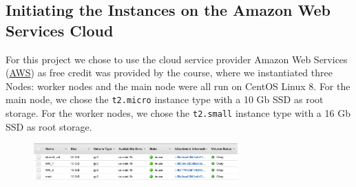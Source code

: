 \documentclass{article}
\begin{document}
\subsection{Initiating the Instances on the Amazon Web Services Cloud}
For this project we chose to use the cloud service provider Amazon Web Services (\href{https://aws.amazon.com/}{AWS}) as free credit was provided by the course, where we instantiated three Nodes: worker nodes and the main node were all run on CentOS Linux 8.
For the main node, we chose the \texttt{t2.micro} instance type with a 10 Gb SSD as root storage.
For the worker nodes, we chose the \texttt{t2.small} instance type with a 16 Gb SSD as root storage.
\begin{figure}[!h]
    \includegraphics[width=0.7\textwidth]{./img/root_storage_shared_vol.png}
\end{figure}
\end{document}
